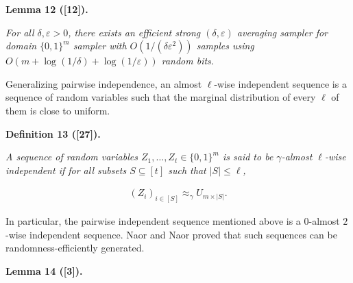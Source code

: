 

\par\medskip\noindent\textbf{
\textbf{Lemma 12}\textbf{ }([12])\textbf{.}
}\par



\emph{For all $\delta,\varepsilon>0$, there exists an efficient strong $(\delta,\varepsilon)$ averaging sampler for domain $\{0,1\}^{m}$ sampler with $O(1/(\delta\varepsilon^{2}))$ samples using $O(m+\log(1/\delta)+\log(1/\varepsilon))$ random bits.}\par






Generalizing pairwise independence, an almost $\ell$-wise independent sequence is a sequence of random variables such that the marginal distribution of every $\ell$ of them is close to uniform.\par





\par\medskip\noindent\textbf{
\textbf{Definition 13}\textbf{ }([27])\textbf{.}
}\par



\emph{A sequence of random variables $Z_{1},\dots,Z_{t}\in\{0,1\}^{m}$ is said to be $\gamma$-almost $\ell$-wise independent if for all subsets $S\subseteq[t]$ such that $|S|\leq\ell$,}\par


\[\begin{gathered}
(Z_{i})_{i\in[S]}\approx_{\gamma}U_{m\times|S|}.
\end{gathered}\]






In particular, the pairwise independent sequence mentioned above is a $0$-almost $2$-wise independent sequence. Naor and Naor proved that such sequences can be randomness-efficiently generated.\par





\par\medskip\noindent\textbf{
\textbf{Lemma 14}\textbf{ }([3])\textbf{.}
}\par



